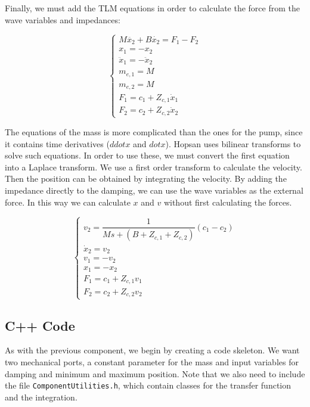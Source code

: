 \documentclass[a4paper,pdftex]{article}
\begin{document}
Finally, we must add the TLM equations in order to calculate the force from the wave variables and impedances:

\begin{equation*}
\begin{cases}
M\ddot{x_{2}} + B\dot{x_{2}} = F_{1} - F_{2}\\
x_{1} = -x_{2} \\
\ddot{x}_{1} = -\ddot{x}_{2} \\
m_{e,1} = M \\
m_{e,2} = M \\
F_{1} = c_{1} + Z_{c,1}\dot{x}_{1} \\
F_{2} = c_{2} + Z_{c,2}\dot{x}_{2} 
\end{cases}
\end{equation*}

The equations of the mass is more complicated than the ones for the pump, since it contains time derivatives ($ddot{x}$ and $dot{x}$). Hopsan uses bilinear transforms to solve such equations. In order to use these, we must convert the first equation into a Laplace transform. We use a first order transform to calculate the velocity. Then the position can be obtained by integrating the velocity. By adding the impedance directly to the damping, we can use the wave variables as the external force. In this way we can calculate $x$ and $v$ without first calculating the forces. 

\begin{equation*}
\begin{cases}
v_{2} = \dfrac{1}{M s + (B+Z_{c,1}+Z_{c,2})}(c_{1}-c_{2}) \\
\dot{x}_{2} = v_{2} \\
v_{1} = -v_{2} \\
x_{1} = -x_{2} \\
F_{1} = c_{1} + Z_{c,1}v_{1} \\
F_{2} = c_{2} + Z_{c,2}v_{2} 
\end{cases}
\end{equation*}

\subsection*{C++ Code}
As with the previous component, we begin by creating a code skeleton. We want two mechanical ports, a constant parameter for the mass and input variables for damping and minimum and maximum position. Note that we also need to include the file \texttt{ComponentUtilities.h}, which contain classes for the transfer function and the integration.
 	
\end{document}

